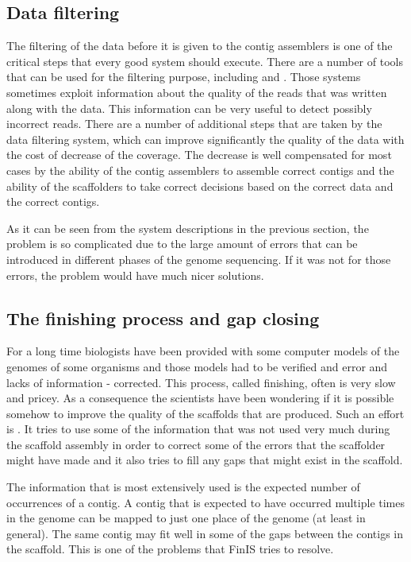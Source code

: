 \documentclass[11pt]{article}
\begin{document}
\subsection{Data filtering} %
\label{sub:Data filtering}
The filtering of the data before it is given to the contig assemblers is one of
the critical steps that every good system should execute. There are a number of
tools that can be used for the filtering purpose, including \cite{quake} and
\cite{filtering-solid}. Those systems sometimes exploit information about the
quality of the reads that was written along with the data. This information can
be very useful to detect possibly incorrect reads. There are a number of
additional steps that are taken by the data filtering system, which can improve
significantly the quality of the data with the cost of decrease of the coverage.
The decrease is well compensated for most cases by the ability of the contig
assemblers to assemble correct contigs and the ability of the scaffolders to
take correct decisions based on the correct data and the correct contigs. 

As it can be seen from the system descriptions in the previous section, the
problem is so complicated due to the large amount of errors that can be
introduced in different phases of the genome sequencing. If it was not for those
errors, the problem would have much nicer solutions.

\subsection{The finishing process and gap closing} %
\label{sub:The finishing process and gap closing}
For a long time biologists have been provided with some computer models of the
genomes of some organisms and those models had to be verified and error and lacks
of information - corrected. This process, called finishing, often is very slow
and pricey. As a consequence the scientists have been wondering if it is
possible somehow to improve the quality of the scaffolds that are produced. Such
an effort is \cite{finIs}. It tries to use some of the information that was not
used very much during the scaffold assembly in order to correct some of the
errors that the scaffolder might have made and it also tries to fill any gaps
that might exist in the scaffold. 

The information that is most extensively used is the expected number of
occurrences of a contig. A contig that is expected to have occurred multiple
times in the genome can be mapped to just one place of the genome (at least in
general). The same contig may fit well in some of the gaps between the contigs
in the scaffold. This is one of the problems that FinIS tries to resolve.
\end{document}

